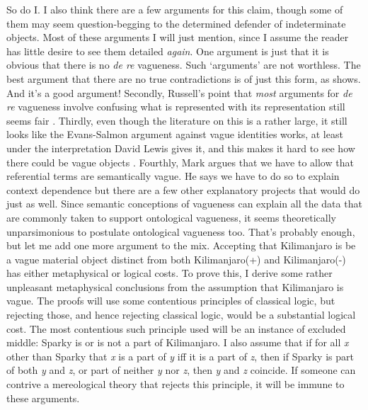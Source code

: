 \noindent So do I. I also think there are a few arguments for this claim, though some of them may seem question-begging to the determined defender of indeterminate objects. Most of these arguments I will just mention, since I assume the reader has little desire to see them detailed \textit{again}. One argument is just that it is obvious that there is no \textit{de re }vagueness. Such `arguments' are not worthless. The best argument that there are no true contradictions is of just this form, as \citet{Priest1998}  shows. And it's a good argument! Secondly, Russell's point that \textit{most }arguments for \textit{de re} vagueness involve confusing what is represented with its representation still seems fair \citep{Russell1923}. Thirdly, even though the literature on this is a rather large, it still looks like the Evans-Salmon argument against vague identities works, at least under the interpretation David Lewis gives it, and this makes it hard to see how there could be vague objects \citep{Evans1978, Salmon1981, Lewis1988g}. Fourthly, Mark \citet{Heller1996} argues that we have to allow that referential terms are semantically vague. He says we have to do so to explain context dependence but there are a few other explanatory projects that would do just as well. Since semantic conceptions of vagueness can explain all the data that are commonly taken to support ontological vagueness, it seems theoretically unparsimonious to postulate ontological vagueness too. That's probably enough, but let me add one more argument to the mix. Accepting that Kilimanjaro is be a vague material object distinct from both Kilimanjaro(+) and Kilimanjaro(-) has either metaphysical or logical costs. To prove this, I derive some rather unpleasant metaphysical conclusions from the assumption that Kilimanjaro is vague. The proofs will use some contentious principles of classical logic, but rejecting those, and hence rejecting classical logic, would be a substantial logical cost. The most contentious such principle used will be an instance of excluded middle: Sparky is or is not a part of Kilimanjaro. I also assume that if for all \textit{x} other than Sparky that \textit{x} is a part of \textit{y} iff it is a part of \textit{z}, then if Sparky is part of both \textit{y} and \textit{z}, or part of neither \textit{y} nor \textit{z}, then \textit{y} and \textit{z} coincide. If someone can contrive a mereological theory that rejects this principle, it will be immune to these arguments.

